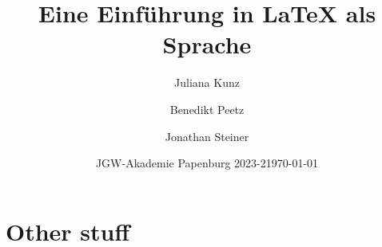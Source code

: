 \documentclass{beamer}
\title[\LaTeX{} Einführung]{Eine Einführung in \LaTeX{} als Sprache}
\author[Juliana, Benedikt, Jonathan]{Juliana Kunz \and Benedikt Peetz \and Jonathan Steiner}
\date[JGW 2023-2]{JGW-Akademie Papenburg 2023-2}
\date{\today}
\begin{document}
    \maketitle

    
    
    
    \section{Other stuff}
\end{document}
